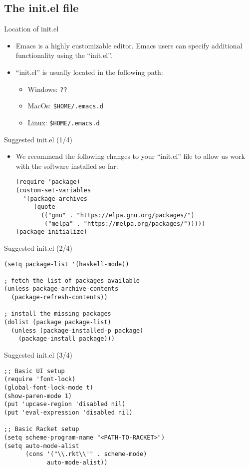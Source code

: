 \subsection{The init.el file}

\begin{frame}[fragile]{Location of init.el}
  \begin{itemize}
  \item Emacs is a highly customizable editor. Emacs users can specify
    additional functionality using the ``init.el''.
  \item ``init.el'' is usually located in the following path:
    \begin{itemize}
    \item Windows: \verb|??|
    \item MacOs: \verb|$HOME/.emacs.d|
    \item Linux: \verb|$HOME/.emacs.d|
    \end{itemize}
  \end{itemize} 
\end{frame}

\begin{frame}[fragile]{Suggested init.el (1/4)}
  \begin{itemize}
  \item We recommend the following changes to your ``init.el'' file to allow us
    work with the software installed so far:
\begin{verbatim}
(require 'package)
(custom-set-variables
  '(package-archives
     (quote
       (("gnu" . "https://elpa.gnu.org/packages/")
        ("melpa" . "https://melpa.org/packages/")))))
(package-initialize)
\end{verbatim}
  \end{itemize} 
\end{frame}

\begin{frame}[fragile]{Suggested init.el (2/4)}
\begin{verbatim}
(setq package-list '(haskell-mode))

; fetch the list of packages available 
(unless package-archive-contents
  (package-refresh-contents))

; install the missing packages
(dolist (package package-list)
  (unless (package-installed-p package)
    (package-install package)))
\end{verbatim}
\end{frame}

\begin{frame}[fragile]{Suggested init.el (3/4)}
 \begin{verbatim}
;; Basic UI setup
(require 'font-lock)
(global-font-lock-mode t)
(show-paren-mode 1)
(put 'upcase-region 'disabled nil)
(put 'eval-expression 'disabled nil)

;; Basic Racket setup
(setq scheme-program-name "<PATH-TO-RACKET>")
(setq auto-mode-alist
      (cons '("\\.rkt\\'" . scheme-mode)
            auto-mode-alist))
\end{verbatim} 
\end{frame}

